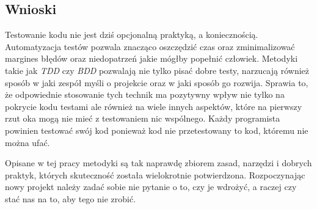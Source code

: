   \subsection{Wnioski}
  
  Testowanie kodu nie jest dziś opcjonalną praktyką, a koniecznością. Automatyzacja testów pozwala znacząco oszczędzić czas oraz zminimalizować margines błędów oraz niedopatrzeń jakie mógłby popełnić człowiek. Metodyki takie jak \emph{TDD} czy \emph{BDD} pozwalają nie tylko pisać dobre testy, narzucają również sposób w jaki zespół myśli o projekcie oraz w jaki sposób go rozwija. Sprawia to, że odpowiednie stosowanie tych technik ma pozytywny wpływ nie tylko na pokrycie kodu testami ale również na wiele innych aspektów, które na pierwszy rzut oka mogą nie mieć z testowaniem nic wspólnego. Każdy programista powinien testować swój kod ponieważ kod nie przetestowany to kod, któremu nie można ufać. 
  
  Opisane w tej pracy metodyki są tak naprawdę zbiorem zasad, narzędzi i dobrych praktyk, których skuteczność została wielokrotnie potwierdzona. Rozpoczynając nowy projekt należy zadać sobie nie pytanie o to, czy je wdrożyć, a raczej czy stać nas na to, aby tego nie zrobić.
  